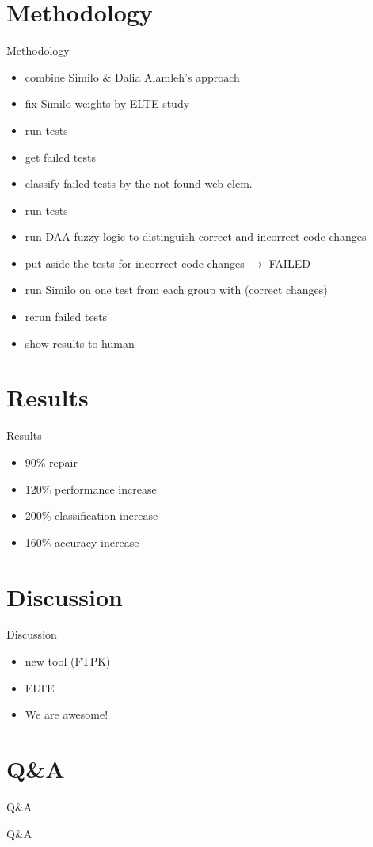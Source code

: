 \documentclass{beamer}
\begin{document}
\section{Methodology}
\begin{frame}{Methodology}
\begin{itemize}
    \item combine Similo \& Dalia Alamleh's approach
    \item fix Similo weights by ELTE study
    \item run tests
    \item get failed tests
    \item classify failed tests by the not found web elem.
    \item run tests
    \item run DAA fuzzy logic to distinguish correct and incorrect code changes 
    \item put aside the tests for incorrect code changes $\rightarrow$ FAILED
    \item run Similo on one test from each group with (correct changes)
    \item rerun failed tests
    \item show results to human
\end{itemize}
\end{frame}

\section{Results}
\begin{frame}{Results}
\begin{itemize}
    \item 90\% repair
    \item 120\% performance increase
    \item 200\% classification increase
    \item 160\% accuracy increase
\end{itemize}
\end{frame}

\section{Discussion}
\begin{frame}{Discussion}
\begin{itemize}
    \item new tool (FTPK)
    \item ELTE
    \item We are awesome!
\end{itemize}
\end{frame}

\section{Q\&A}
\begin{frame}{Q\&A}
\begin{center}
\begin{Huge}
    Q\&A
\end{Huge}
\end{center}
\end{frame}
\end{document}
